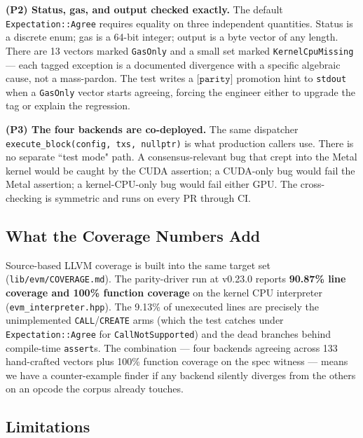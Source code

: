 \textbf{(P2) Status, gas, and output checked exactly.} The default
\texttt{Expectation::Agree} requires equality on three independent
quantities. Status is a discrete enum; gas is a 64-bit integer; output
is a byte vector of any length. There are 13 vectors marked
\texttt{GasOnly} and a small set marked \texttt{KernelCpuMissing} ---
each tagged exception is a documented divergence with a specific algebraic
cause, not a mass-pardon. The test writes a $\texttt{[parity]}$ promotion
hint to \texttt{stdout} when a \texttt{GasOnly} vector starts agreeing,
forcing the engineer either to upgrade the tag or explain the regression.

\textbf{(P3) The four backends are co-deployed.} The same dispatcher
\texttt{execute\_block(config, txs, nullptr)} is what production callers
use. There is no separate ``test mode" path. A consensus-relevant bug
that crept into the Metal kernel would be caught by the CUDA assertion;
a CUDA-only bug would fail the Metal assertion; a kernel-CPU-only bug
would fail either GPU. The cross-checking is symmetric and runs on
every PR through CI.

\subsection{What the Coverage Numbers Add}

Source-based LLVM coverage is built into the same target set
(\texttt{lib/evm/COVERAGE.md}). The parity-driver run at v0.23.0 reports
\textbf{90.87\% line coverage and 100\% function coverage} on the kernel
CPU interpreter (\texttt{evm\_interpreter.hpp}). The 9.13\% of unexecuted
lines are precisely the unimplemented \texttt{CALL}/\texttt{CREATE}
arms (which the test catches under \texttt{Expectation::Agree} for
\texttt{CallNotSupported}) and the dead branches behind compile-time
\texttt{assert}s. The combination --- four backends agreeing across
133 hand-crafted vectors plus 100\% function coverage on the spec
witness --- means we have a counter-example finder if any backend silently
diverges from the others on an opcode the corpus already touches.

\subsection{Limitations}

